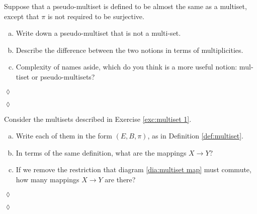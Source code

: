 \documentclass[a4paper]{book}
\def\to{\rightarrow}
\theoremstyle{myth}
\newtheorem{excENG}[envENG]{\begin{english}Exercise\end{english}}
\newenvironment{exerciseENG}{\begin{excENG}}{\hspace*{\fill}$\lozenge$\end{excENG}}
\newtheorem{excRUS}[envRUS]{\begin{russian}Упражнение\end{russian}}
\newtheorem{definitionRUS}[envRUS]{\begin{russian}Определение\end{russian}}
\newenvironment{exerciseRUS}{\begin{excRUS}}{\hspace*{\fill}$\lozenge$\end{excRUS}}
\def\sexc{\begin{enumerate}[a.)]\setlength{\itemsep}{.1cm}\setlength{\parskip}{.1cm}\item}
\def\next{\item}
\def\endsexc{\end{enumerate}}
\begin{document}
\begin{english}
\begin{definitionRUS}\label{def:multiset}
\begin{russian} \end{russian}
\end{definitionRUS}

\begin{exerciseENG}
Suppose that a pseudo-multiset is defined to be almost the same as a multiset, except that $\pi$ is not required to be surjective. 
\sexc Write down a pseudo-multiset that is not a multi-set. 
\next Describe the difference between the two notions in terms of multiplicities. 
\next Complexity of names aside, which do you think is a more useful notion: multiset or pseudo-multisets? 
\endsexc
\end{exerciseENG}

\begin{exerciseRUS}
\begin{russian} \end{russian}
\end{exerciseRUS}

\begin{exerciseENG}
Consider the multisets described in Exercise \ref{exc:multiset 1}. 
\sexc Write each of them in the form $(E,B,\pi)$, as in Definition \ref{def:multiset}. 
\next In terms of the same definition, what are the mappings $X\to Y$? 
\next If we remove the restriction that diagram \ref{dia:multiset map} must commute, how many mappings $X\to Y$ are there?
\endsexc
\end{exerciseENG}

\begin{exerciseRUS}
\begin{russian} \end{russian}
\end{exerciseRUS}


\end{english}
\end{document}
